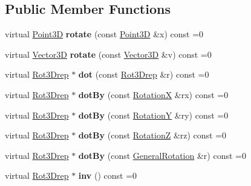 \subsection*{Public Member Functions}
\begin{DoxyCompactItemize}
\item 
\mbox{\label{classRot3Drep_a144f6f5232faf1fcf2ff26e53197e8b6}} 
virtual \hyperlink{classTVec3D}{Point3D} {\bfseries rotate} (const \hyperlink{classTVec3D}{Point3D} \&x) const =0
\item 
\mbox{\label{classRot3Drep_ac1cdcfb8bb353d4fb8b5053dfa27774d}} 
virtual \hyperlink{classTVec3D}{Vector3D} {\bfseries rotate} (const \hyperlink{classTVec3D}{Vector3D} \&v) const =0
\item 
\mbox{\label{classRot3Drep_a79665bf674cb75448e93f7920734530f}} 
virtual \hyperlink{classRot3Drep}{Rot3\+Drep} $\ast$ {\bfseries dot} (const \hyperlink{classRot3Drep}{Rot3\+Drep} \&r) const =0
\item 
\mbox{\label{classRot3Drep_abd05a5836c8cb0f5972fda589ea41d25}} 
virtual \hyperlink{classRot3Drep}{Rot3\+Drep} $\ast$ {\bfseries dot\+By} (const \hyperlink{classRotationX}{RotationX} \&rx) const =0
\item 
\mbox{\label{classRot3Drep_ab798a9dd3e86994e08059169a3471195}} 
virtual \hyperlink{classRot3Drep}{Rot3\+Drep} $\ast$ {\bfseries dot\+By} (const \hyperlink{classRotationY}{RotationY} \&ry) const =0
\item 
\mbox{\label{classRot3Drep_a4a748754154757e4c3504248067a33cf}} 
virtual \hyperlink{classRot3Drep}{Rot3\+Drep} $\ast$ {\bfseries dot\+By} (const \hyperlink{classRotationZ}{RotationZ} \&rz) const =0
\item 
\mbox{\label{classRot3Drep_aa33517e145be705c02fa3c76a7e35431}} 
virtual \hyperlink{classRot3Drep}{Rot3\+Drep} $\ast$ {\bfseries dot\+By} (const \hyperlink{classGeneralRotation}{General\+Rotation} \&r) const =0
\item 
\mbox{\label{classRot3Drep_a4b69c235b8f058be5f0730cc48406623}} 
virtual \hyperlink{classRot3Drep}{Rot3\+Drep} $\ast$ {\bfseries inv} () const =0

\end{DoxyCompactItemize}
